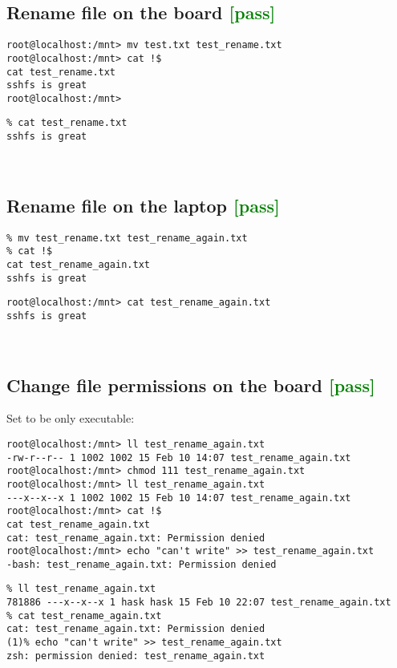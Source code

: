 \documentclass[a4paper]{report}
\begin{document}
\begin{enumerate}
\subsection{Rename file on the board \textcolor{green}{[pass]}}
\begin{lstlisting}
root@localhost:/mnt> mv test.txt test_rename.txt
root@localhost:/mnt> cat !$
cat test_rename.txt
sshfs is great
root@localhost:/mnt> 
\end{lstlisting}
\begin{lstlisting}
% cat test_rename.txt                   
sshfs is great
\end{lstlisting}\null\\
\subsection{Rename file on the laptop \textcolor{green}{[pass]}}
\begin{lstlisting}
% mv test_rename.txt test_rename_again.txt
% cat !$                                 
cat test_rename_again.txt
sshfs is great
\end{lstlisting}
\begin{lstlisting}
root@localhost:/mnt> cat test_rename_again.txt 
sshfs is great
\end{lstlisting}\null\\
\subsection{Change file permissions on the board \textcolor{green}{[pass]}}
Set to be only executable:
\begin{lstlisting}
root@localhost:/mnt> ll test_rename_again.txt 
-rw-r--r-- 1 1002 1002 15 Feb 10 14:07 test_rename_again.txt
root@localhost:/mnt> chmod 111 test_rename_again.txt 
root@localhost:/mnt> ll test_rename_again.txt 
---x--x--x 1 1002 1002 15 Feb 10 14:07 test_rename_again.txt
root@localhost:/mnt> cat !$
cat test_rename_again.txt
cat: test_rename_again.txt: Permission denied
root@localhost:/mnt> echo "can't write" >> test_rename_again.txt 
-bash: test_rename_again.txt: Permission denied
\end{lstlisting}
\begin{lstlisting}
% ll test_rename_again.txt 
781886 ---x--x--x 1 hask hask 15 Feb 10 22:07 test_rename_again.txt
% cat test_rename_again.txt    
cat: test_rename_again.txt: Permission denied
(1)% echo "can't write" >> test_rename_again.txt
zsh: permission denied: test_rename_again.txt
\end{lstlisting}\null\\

\end{enumerate}
\end{document}
